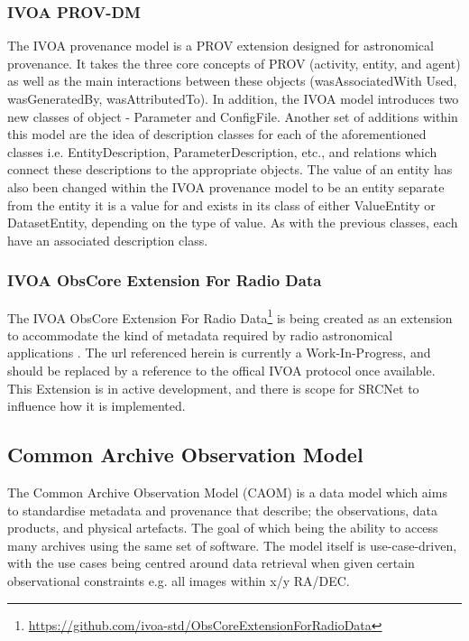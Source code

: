 \subsubsection{IVOA PROV-DM}

The IVOA provenance model is a PROV extension designed for astronomical provenance.
It takes the three core concepts of PROV (activity, entity, and agent) as well as the main interactions between these objects (wasAssociatedWith Used, wasGeneratedBy, wasAttributedTo).
In addition, the IVOA model introduces two new classes of object - Parameter and ConfigFile. 
Another set of additions within this model are the idea of description classes for each of the aforementioned classes i.e. EntityDescription, ParameterDescription, etc., and relations which connect these descriptions to the appropriate objects.
The value of an entity has also been changed within the IVOA provenance model to be an entity separate from the entity it is a value for and exists in its class of either ValueEntity or DatasetEntity, depending on the type of value.
As with the previous classes, each have an associated description class. 


\subsubsection{IVOA ObsCore Extension For Radio Data}
    
The IVOA ObsCore Extension For Radio Data\footnote{\url{https://github.com/ivoa-std/ObsCoreExtensionForRadioData}} is being created as an extension to accommodate the kind of metadata required by radio astronomical applications .  The url referenced herein is currently a Work-In-Progress, and should be replaced by a reference to the offical IVOA protocol once available.  This Extension is in active development, and there is scope for SRCNet to influence how it is implemented.

\subsection{Common Archive Observation Model}

The Common Archive Observation Model (CAOM) is a data model which aims to standardise metadata and provenance that describe; the observations, data products, and physical artefacts. The goal of which being the ability to access many archives using the same set of software. The model itself is use-case-driven, with the use cases being centred around data retrieval when given certain observational constraints e.g. all images within x/y RA/DEC. 

